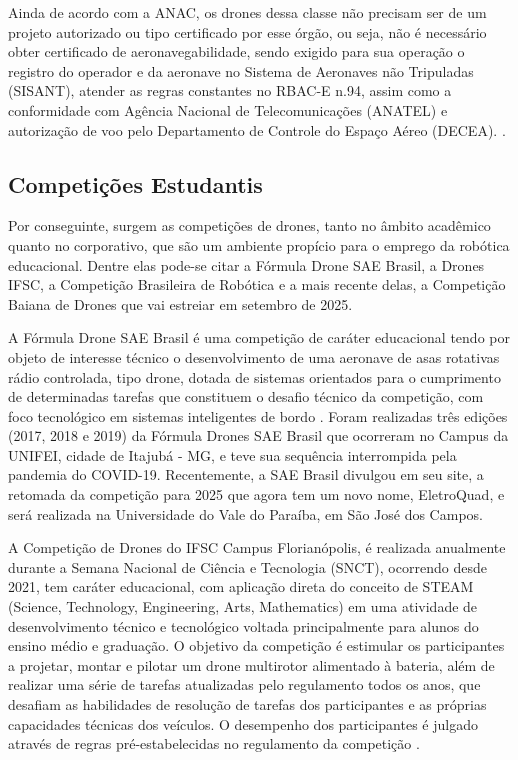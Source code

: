 \documentclass[conference]{IEEEtran}
\begin{document}
Ainda de acordo com a ANAC, os drones dessa classe não precisam ser de um projeto autorizado ou tipo certificado por esse órgão, ou seja, não é necessário obter certificado de aeronavegabilidade, sendo exigido para sua operação o registro do operador e da aeronave no Sistema de Aeronaves não Tripuladas (SISANT), atender as regras constantes no RBAC-E n.94, assim como a conformidade com Agência Nacional de Telecomunicações (ANATEL) e autorização de voo pelo Departamento de Controle do Espaço Aéreo (DECEA).
\cite{b2}.

\subsection{Competições Estudantis}

Por conseguinte, surgem as competições de drones, tanto no âmbito acadêmico quanto no corporativo, que são um ambiente propício para o emprego da robótica educacional. Dentre elas pode-se citar a Fórmula Drone SAE Brasil,  a Drones IFSC, a Competição Brasileira de Robótica e a mais recente delas, a Competição Baiana de Drones que vai estreiar em setembro de 2025.

A Fórmula Drone SAE Brasil é uma competição de caráter educacional tendo por objeto de interesse técnico o desenvolvimento de uma aeronave de asas rotativas rádio controlada, tipo drone, dotada de sistemas orientados para o cumprimento de determinadas tarefas que constituem o desafio técnico da competição, com foco tecnológico em sistemas inteligentes de bordo \cite{b7}. Foram realizadas três edições (2017, 2018 e 2019) da Fórmula Drones SAE Brasil que ocorreram no Campus da UNIFEI, cidade de Itajubá - MG, e teve sua sequência interrompida pela pandemia do COVID-19. Recentemente, a SAE Brasil divulgou em seu site, a retomada da competição para 2025 que agora tem um novo nome, EletroQuad, e será realizada na Universidade do Vale do Paraíba, em São José dos Campos.

A Competição de Drones do IFSC Campus Florianópolis, é realizada anualmente durante a Semana Nacional de Ciência e Tecnologia (SNCT), ocorrendo desde 2021, tem caráter educacional, com aplicação direta do conceito de STEAM (Science, Technology, Engineering, Arts, Mathematics) em uma atividade de desenvolvimento técnico e tecnológico voltada principalmente para alunos do ensino médio e graduação. O objetivo da competição é estimular os participantes a projetar, montar e pilotar um drone multirotor alimentado à bateria, além de realizar uma série de tarefas atualizadas pelo regulamento todos os anos, que desafiam as habilidades de resolução de tarefas dos participantes e as próprias capacidades técnicas dos veículos. O desempenho dos participantes é julgado através de regras pré-estabelecidas no regulamento da competição \cite{b4}.
\end{document}
